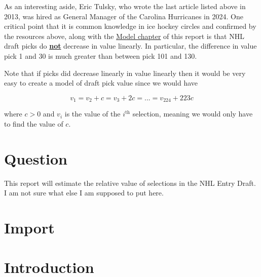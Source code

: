 \documentclass[
  letterpaper,
  DIV=11,
  numbers=noendperiod]{scrreprt}
\begin{document}
As an interesting aside, Eric Tulsky, who wrote the last article listed
above in 2013, was hired as General Manager of the Carolina Hurricanes
in 2024. One critical point that it is common knowledge in ice hockey
circles and confirmed by the resources above, along with the
\href{https://trevsteu.github.io/Stat468_Final/model.html}{Model
chapter} of this report is that NHL draft picks do \ul{\textbf{not}}
decrease in value linearly. In particular, the difference in value pick
1 and 30 is much greater than between pick 101 and 130.

Note that if picks did decrease linearly in value linearly then it would
be very easy to create a model of draft pick value since we would have

\[
v_1 = v_2 + c = v_3 + 2c = ... = v_{224} + 223c
\]

where \(c > 0\) and \(v_i\) is the value of the \(i^{\text{th}}\)
selection, meaning we would only have to find the value of \(c\).


\chapter{Question}\label{question}

This report will estimate the relative value of selections in the NHL
Entry Draft. I am not sure what else I am supposed to put here.


\chapter{Import}\label{import}


\chapter{Introduction}\label{introduction}
\end{document}
